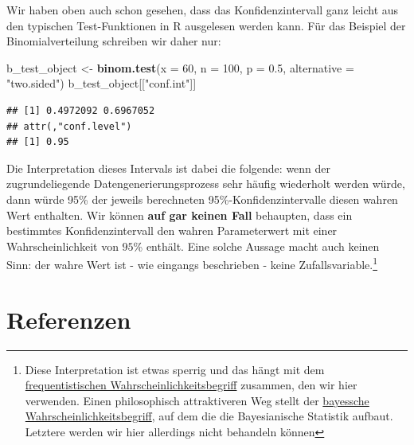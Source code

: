 \documentclass[]{book}
\newenvironment{Shaded}{\begin{snugshade}}{\end{snugshade}}
\newcommand{\KeywordTok}[1]{\textcolor[rgb]{0.13,0.29,0.53}{\textbf{#1}}}
\newcommand{\DataTypeTok}[1]{\textcolor[rgb]{0.13,0.29,0.53}{#1}}
\newcommand{\DecValTok}[1]{\textcolor[rgb]{0.00,0.00,0.81}{#1}}
\newcommand{\FloatTok}[1]{\textcolor[rgb]{0.00,0.00,0.81}{#1}}
\newcommand{\StringTok}[1]{\textcolor[rgb]{0.31,0.60,0.02}{#1}}
\newcommand{\NormalTok}[1]{#1}
\let\rmarkdownfootnote\footnote%
\def\footnote{\protect\rmarkdownfootnote}
\begin{document}
Wir haben oben auch schon gesehen, dass das Konfidenzintervall ganz
leicht aus den typischen Test-Funktionen in R ausgelesen werden kann.
Für das Beispiel der Binomialverteilung schreiben wir daher nur:

\begin{Shaded}
\begin{Highlighting}[]
\NormalTok{b_test_object <-}\StringTok{ }\KeywordTok{binom.test}\NormalTok{(}\DataTypeTok{x =} \DecValTok{60}\NormalTok{, }\DataTypeTok{n =} \DecValTok{100}\NormalTok{, }\DataTypeTok{p =} \FloatTok{0.5}\NormalTok{, }\DataTypeTok{alternative =} \StringTok{"two.sided"}\NormalTok{)}
\NormalTok{b_test_object[[}\StringTok{"conf.int"}\NormalTok{]]}
\end{Highlighting}
\end{Shaded}

\begin{verbatim}
## [1] 0.4972092 0.6967052
## attr(,"conf.level")
## [1] 0.95
\end{verbatim}

Die Interpretation dieses Intervals ist dabei die folgende: wenn der
zugrundeliegende Datengenerierungsprozess sehr häufig wiederholt werden
würde, dann würde 95\% der jeweils berechneten 95\%-Konfidenzintervalle
diesen wahren Wert enthalten. Wir können \textbf{auf gar keinen Fall}
behaupten, dass ein bestimmtes Konfidenzintervall den wahren
Parameterwert mit einer Wahrscheinlichkeit von \(95\)\% enthält. Eine
solche Aussage macht auch keinen Sinn: der wahre Wert ist - wie eingangs
beschrieben - keine Zufallsvariable.\footnote{Diese Interpretation ist
  etwas sperrig und das hängt mit dem
  \href{https://de.wikipedia.org/wiki/Frequentistischer_Wahrscheinlichkeitsbegriff}{frequentistischen
  Wahrscheinlichkeitsbegriff} zusammen, den wir hier verwenden. Einen
  philosophisch attraktiveren Weg stellt der
  \href{https://de.wikipedia.org/wiki/Bayesscher_Wahrscheinlichkeitsbegriff}{bayessche
  Wahrscheinlichkeitsbegriff}, auf dem die die Bayesianische Statistik
  aufbaut. Letztere werden wir hier allerdings nicht behandeln können}

\chapter{Referenzen}\label{refs}


\end{document}
